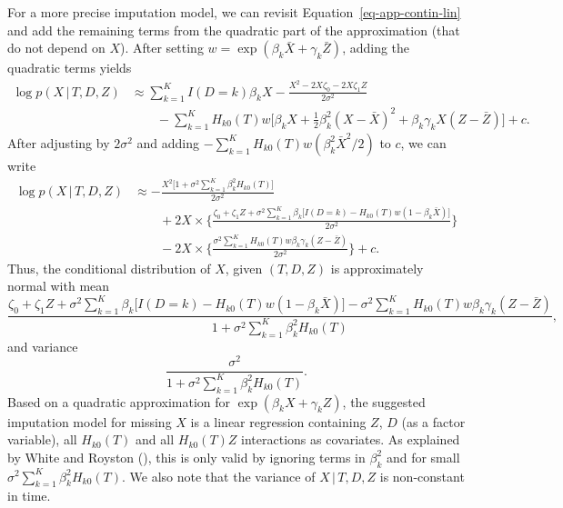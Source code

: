 \documentclass[
  letterpaper,
  paper=240mm:170mm,
  twoside=true,
  open=right,
  fontsize=10pt,
  pagesize=false,
  BCOR=15mm,
  DIV=14,
  headinclude=true,
  footinclude=false,
  headsepline=on]{scrbook}
\newcommand{\given}{\,|\,}
\begin{document}
For a more precise imputation model, we can revisit
Equation~\ref{eq-app-contin-lin} and add the remaining terms from the
quadratic part of the approximation (that do not depend on \(X\)). After
setting \(w = \exp(\beta_k \bar{X} + \gamma_k \bar{Z})\), adding the
quadratic terms yields \begin{align*}
    \log p(X \given T, D, Z) &\approx \sum^K_{k = 1} I(D=k) \beta_k X - \frac{X^2 - 2X\zeta_0 - 2X\zeta_1 Z}{2\sigma^2} \\
    &\qquad - \sum^K_{k = 1} H_{k0}(T) w \bigg[ \beta_k X + \frac{1}{2} \beta_k^2(X - \bar{X})^2 + \beta_k \gamma_k X (Z - \bar{Z}) \bigg] + c.
\end{align*} After adjusting by \(2\sigma^2\) and adding
\(- \sum^K_{k = 1} H_{k0}(T) w(\beta^2_k\bar{X}^2/2)\) to \(c\), we can
write \begin{align*}
    \log p(X \given T, D, Z) &\approx -\frac{X^2\big[1 + \sigma^2 \sum^K_{k = 1} \beta_k^2  H_{k0}(T)\big]}{2\sigma^2} \\
    &\qquad + 2X \times \Biggl\{ \frac{\zeta_0 + \zeta_1 Z +  \sigma^2 \sum^K_{k = 1} \beta_k \big[ I(D=k) - H_{k0}(T)w(1 - \beta_k \bar{X}) \big]}{2\sigma^2} \Biggr\} \\
    &\qquad - 2X \times \Biggl\{ \frac{\sigma^2\sum^K_{k = 1}H_{k0}(T)w \beta_k \gamma_k(Z - \bar{Z})}{2\sigma^2}\Biggr\} + c.
\end{align*} Thus, the conditional distribution of \(X\), given
\((T, D, Z)\) is approximately normal with mean \begin{equation*}
    \frac{\zeta_0 + \zeta_1 Z +  \sigma^2 \sum^K_{k = 1} \beta_k \big[ I(D=k) - H_{k0}(T)w(1 - \beta_k \bar{X}) \big] - \sigma^2\sum^K_{k = 1}H_{k0}(T)w \beta_k \gamma_k(Z - \bar{Z})}{1 + \sigma^2 \sum^K_{k = 1} \beta_k^2  H_{k0}(T)},
\end{equation*} and variance \begin{equation*}
    \frac{\sigma^2}{1 + \sigma^2 \sum^K_{k = 1} \beta_k^2  H_{k0}(T)}.
\end{equation*} Based on a quadratic approximation for
\(\exp(\beta_k X + \gamma_k Z)\), the suggested imputation model for
missing \(X\) is a linear regression containing \(Z\), \(D\) (as a
factor variable), all \(H_{k0}(T)\) and all \(H_{k0}(T)Z\) interactions
as covariates. As explained by White and Royston
(), this is only
valid by ignoring terms in \(\beta^2_k\) and for small
\(\sigma^2 \sum^K_{k = 1} \beta_k^2  H_{k0}(T)\). We also note that the
variance of \(X \given T, D, Z\) is non-constant in time.
\end{document}
